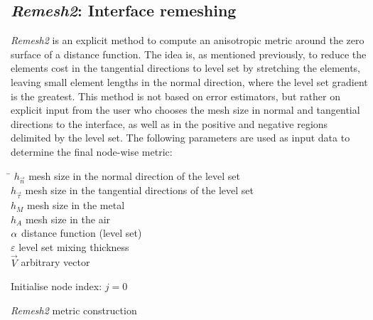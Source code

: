 \subsection{\emph{Remesh2}: Interface remeshing}
\emph{Remesh2} is an explicit method to compute an anisotropic metric around the zero surface of a distance function.
The idea is, as mentioned previously, to reduce the elements cost in the tangential directions to level set by
stretching the elements, leaving small element lengths in the normal direction, where the level set gradient is the greatest.
This method is not based on error estimators, but rather on explicit input from the user who chooses the mesh size in
normal and tangential directions to the interface, as well as in the positive and negative regions delimited by the level set.
The following parameters are used as input data to determine the final node-wise metric:
\begin{tabbing}
\hspace{1cm}\=\kill
$h_{\vec{n}}$ \> mesh size in the normal direction of the level set\\ 
$h_{\vec{\tau}}$ \> mesh size in the tangential directions of the level set\\ 
$h_M$ \>  mesh size in the metal \\
$h_A$ \>  mesh size in the air  \\
$\alpha$ \> distance function (level set) \\
$\varepsilon$ \>  level set mixing thickness \\
$\vec{V}$ \> arbitrary vector
\end{tabbing} 
\begin{algorithm}[H]
 Initialise node index: $j=0$\;
 \caption{\emph{Remesh2} metric construction}
\end{algorithm}


